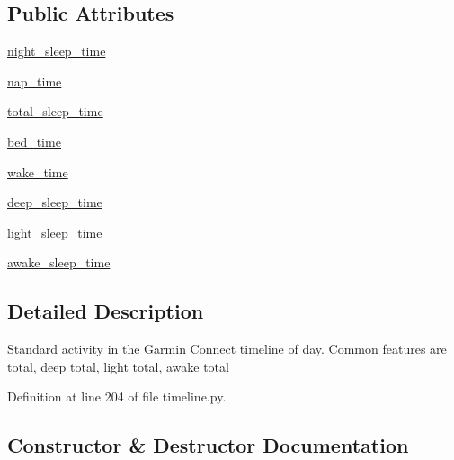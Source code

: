 \subsection*{Public Attributes}
\begin{DoxyCompactItemize}
\item 
\hyperlink{classpygce_1_1models_1_1garmin_1_1timeline_1_1_g_c_day_sleep_a4f8e3dadd2689156a80a21698b426e03}{night\+\_\+sleep\+\_\+time}
\item 
\hyperlink{classpygce_1_1models_1_1garmin_1_1timeline_1_1_g_c_day_sleep_af5aefe888d858cd929d598544802f2a8}{nap\+\_\+time}
\item 
\hyperlink{classpygce_1_1models_1_1garmin_1_1timeline_1_1_g_c_day_sleep_a4942fa038d25a7af4c0793da1b3abf86}{total\+\_\+sleep\+\_\+time}
\item 
\hyperlink{classpygce_1_1models_1_1garmin_1_1timeline_1_1_g_c_day_sleep_a25002c89e8687bc2a88ea5da386332cd}{bed\+\_\+time}
\item 
\hyperlink{classpygce_1_1models_1_1garmin_1_1timeline_1_1_g_c_day_sleep_abb2351f921e38ff370e1ad0822957553}{wake\+\_\+time}
\item 
\hyperlink{classpygce_1_1models_1_1garmin_1_1timeline_1_1_g_c_day_sleep_a95ebbbd000c531843a8a7fa7f8788f72}{deep\+\_\+sleep\+\_\+time}
\item 
\hyperlink{classpygce_1_1models_1_1garmin_1_1timeline_1_1_g_c_day_sleep_a49295ce80915e2012694a35edbf7ad7d}{light\+\_\+sleep\+\_\+time}
\item 
\hyperlink{classpygce_1_1models_1_1garmin_1_1timeline_1_1_g_c_day_sleep_aefd01be519ebb8192b0887941b66eda0}{awake\+\_\+sleep\+\_\+time}
\end{DoxyCompactItemize}


\subsection{Detailed Description}
\begin{DoxyVerb}Standard activity in the Garmin Connect timeline of day.
Common features are total, deep total, light total, awake total
\end{DoxyVerb}
 

Definition at line 204 of file timeline.\+py.



\subsection{Constructor \& Destructor Documentation}
\mbox{\label{classpygce_1_1models_1_1garmin_1_1timeline_1_1_g_c_day_sleep_a58d1e0c8797955f8d88f1e662dc9ec76}} 

